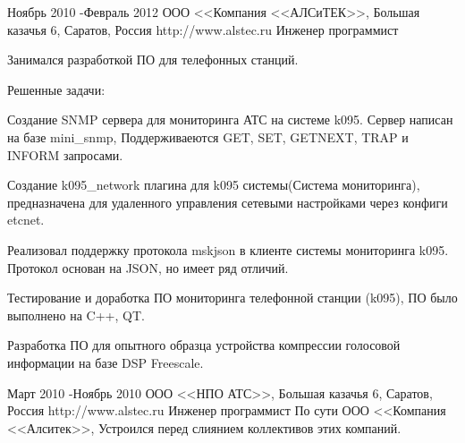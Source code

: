\job
{Ноябрь 2010 -}{Февраль 2012}
{ООО <<Компания <<АЛСиТЕК>>, Большая казачья 6, Саратов, Россия}
{http://www.alstec.ru}
{Инженер программист}
{Занимался разработкой ПО для телефонных станций.

Решенные задачи:
\begin{itemize-noindent}
\item{Создание SNMP сервера для мониторинга АТС на системе k095. Сервер написан на базе mini\_snmp, Поддерживаеются GET, SET, GETNEXT, TRAP и INFORM запросами.}
\item{Создание k095\_network плагина для k095 системы(Система мониторинга), предназначена для удаленного управления сетевыми настройками через конфиги etcnet. }
\item{Реализовал поддержку протокола mskjson в клиенте системы мониторинга k095. Протокол основан на JSON, но имеет ряд отличий.}
\item{Тестирование и доработка ПО мониторинга телефонной станции (k095), ПО было выполнено на C++, QT.}
\item{Разработка ПО для опытного образца устройства компрессии голосовой информации на базе DSP Freescale.}
\end{itemize-noindent}
}


\job
{Март 2010 -}{Ноябрь 2010}
{ООО <<НПО АТС>>, Большая казачья 6, Саратов, Россия}
{http://www.alstec.ru}
{Инженер программист}
{По сути ООО <<Компания <<Алситек>>, Устроился перед слиянием коллективов этих компаний.}


